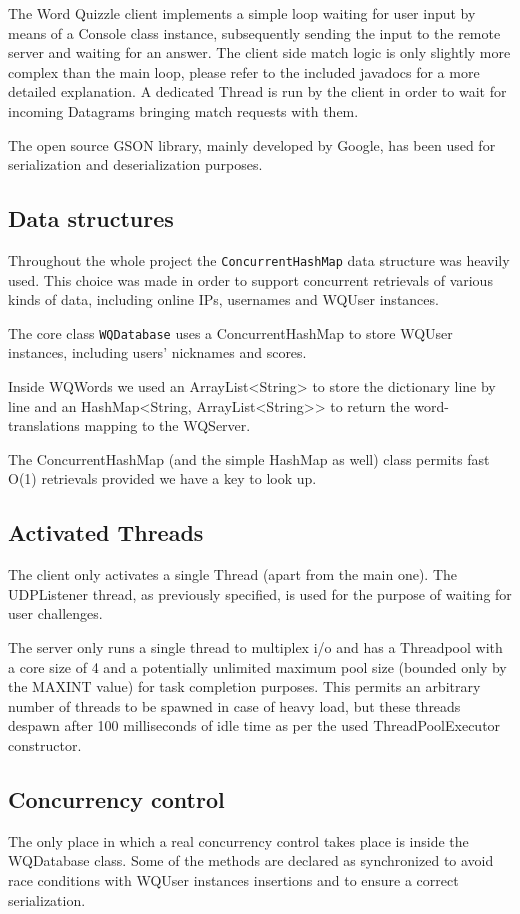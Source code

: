 \documentclass[a4paper,11pt]{article}
\begin{document}
The Word Quizzle client implements a simple loop waiting for user input by means of a Console class instance, subsequently sending the input to the remote server and waiting for an answer. The client side match logic is only slightly more complex than the main loop, please refer to the included javadocs for a more detailed explanation. A dedicated Thread is run by the client in order to wait for incoming Datagrams bringing match requests with them.

The open source GSON library, mainly developed by Google, has been used for serialization and deserialization purposes.

\subsection{Data structures}
Throughout the whole project the  \texttt{ConcurrentHashMap} data structure was heavily used. This choice was made in order to support concurrent retrievals of various kinds of data, including online IPs, usernames and WQUser instances.

The core class \texttt{WQDatabase} uses a ConcurrentHashMap to store WQUser instances, including users' nicknames and scores.

Inside WQWords we used an ArrayList<String> to store the dictionary line by line and an HashMap<String, ArrayList<String>{}> to return the word-translations mapping to the WQServer.

The ConcurrentHashMap (and the simple HashMap as well) class permits fast O(1) retrievals provided we have a key to look up.


\subsection{Activated Threads}
The client only activates a single Thread (apart from the main one). The UDPListener thread, as previously specified, is used for the purpose of waiting for user challenges.

The server only runs a single thread to multiplex i/o and has a Threadpool with a core size of 4 and a potentially unlimited maximum pool size (bounded only by the MAXINT value) for task completion purposes. This permits an arbitrary number of threads to be spawned in case of heavy load, but these threads despawn after 100 milliseconds of idle time as per the used ThreadPoolExecutor constructor.

\subsection{Concurrency control}
The only place in which a real concurrency control takes place is inside the WQDatabase class. Some of the methods are declared as synchronized to avoid race conditions with WQUser instances insertions and to ensure a correct serialization.
\end{document}

